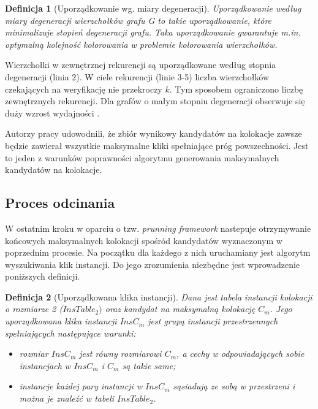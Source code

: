 \documentclass[12pt]{article}
\newtheorem{defin}{Definicja}
\newcounter{algorytm}
\begin{document}
\begin{defin}[Uporządkowanie wg. miary degeneracji]
Uporządkowanie według miary degeneracji wierzchołków grafu G to takie uporządkowanie, które minimalizuje stopień degeneracji grafu. Taka uporządkowanie gwarantuje m.in. optymalną kolejność kolorowania w problemie kolorowania wierzchołków.
\end{defin}

Wierzchołki w zewnętrznej rekurencji są uporządkowane według stopnia degeneracji (linia 2). W ciele rekurencji (linie 3-5) liczba wierzchołków czekających na weryfikację nie przekroczy $ k $. Tym sposobem ograniczono liczbę zewnętrznych rekurencji. Dla grafów o małym stopniu degeneracji obserwuje się duży wzrost wydajności \cite{degenerat}.

Autorzy pracy \cite{wang} udowodnili, że zbiór wynikowy kandydatów na kolokacje zawsze będzie zawierał wszystkie maksymalne kliki spełniające próg powszechności. Jest to jeden z warunków poprawności algorytmu generowania maksymalnych kandydatów na kolokacje.

\subsection{Proces odcinania}

W ostatnim kroku w oparciu o tzw. \textit{prunning framework} \cite{wang} nastepuje otrzymywanie końcowych maksymalnych kolokacji spośród kandydatów wyznaczonym w poprzednim procesie. Na początku dla każdego z nich uruchamiany jest algorytm wyszukiwania klik instancji. Do jego zrozumienia niezbędne jest wprowadzenie poniższych definicji.

\begin{defin}[Uporządkowana klika instancji]
Dana jest tabela instancji kolokacji o rozmiarze 2 ($ InsTable_{2}) $ oraz kandydat na maksymalną kolokację $ C_{m} $. Jego uporządkowana klika instancji $ InsC_{m} $ jest grupą instancji przestrzennych spełniających następujące warunki:
\begin{itemize}
\item rozmiar $ InsC_{m} $ jest równy rozmiarowi $ C_{m} $, a cechy w odpowiadających sobie instancjach w $ InsC_{m} $ i $ C_{m} $ są takie same; %
\item instancje każdej pary instancji w $ InsC_{m} $ sąsiadują ze sobą w przestrzeni i można je znaleźć w tabeli  $ InsTable_{2} $.
\end{itemize}
\end{defin}
\end{document}
